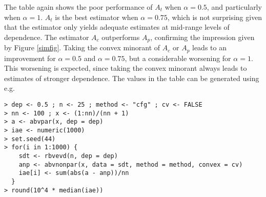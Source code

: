\documentclass[11pt,a4paper]{article}
\begin{document}
The table again shows the poor performance of $A_t$ when $\alpha = 0.5$, and particularly when $\alpha = 1$.
$A_t$ is the best estimator when $\alpha = 0.75$, which is not surprising given that the estimator only yields adequate estimates at mid-range levels of dependence.
The estimator $A_c$ outperforms $A_p$, confirming the impression given by Figure \ref{simfig}.
Taking the convex minorant of $A_c$ or $A_p$ leads to an improvement for $\alpha = 0.5$ and $\alpha = 0.75$, but a considerable worsening for $\alpha = 1$.
This worsening is expected, since taking the convex minorant always leads to estimates of stronger dependence.
The values in the table can be generated using e.g.

\begin{verbatim}
> dep <- 0.5 ; n <- 25 ; method <- "cfg" ; cv <- FALSE
> nn <- 100 ; x <- (1:nn)/(nn + 1)
> a <- abvpar(x, dep = dep)
> iae <- numeric(1000)
> set.seed(44)
> for(i in 1:1000) {
    sdt <- rbvevd(n, dep = dep)
    anp <- abvnonpar(x, data = sdt, method = method, convex = cv)
    iae[i] <- sum(abs(a - anp))/nn
  }
> round(10^4 * median(iae))
\end{verbatim}

%
\end{document}
